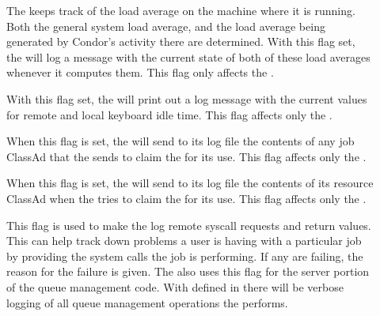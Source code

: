 \begin{description}
\begin{description}
\item[] \label{dflag:load}
The  keeps track
  of the load average on the machine where it is running.  Both the
  general system load average, and the load average being generated by
  Condor's activity there are determined.
  With this flag set, the 
  will log a message with the current state of both of these
  load averages whenever it computes them.  This flag only affects the
  .

\item[] \label{dflag:keyboard} 
  With this flag set, the  will print out a log message
  with the current values for remote and local keyboard idle time.
  This flag affects only the .

\item[] \label{dflag:job}
  When this flag is set, the
   will send to its log file the contents of any
  job ClassAd that the  sends to claim the
   for its use.  This flag affects only the
  .
  
\item[] \label{dflag:machine}
  When this flag is set,
  the  will send to its log file the contents of
  its resource ClassAd when the  tries to claim the
   for its use.  This flag affects only the
  .

\item[] \label{dflag:syscalls}
  This flag is used to
  make the  log remote syscall requests and return
  values.  This can help track down problems a user is having with a
  particular job by providing the system calls the job is
  performing. If any are failing, the reason for the
  failure is given.  The  also uses this flag for the server
  portion of the queue management code.  With 
  defined in  there will be verbose logging of all
  queue management operations the  performs.  


\end{description}
\end{description}
